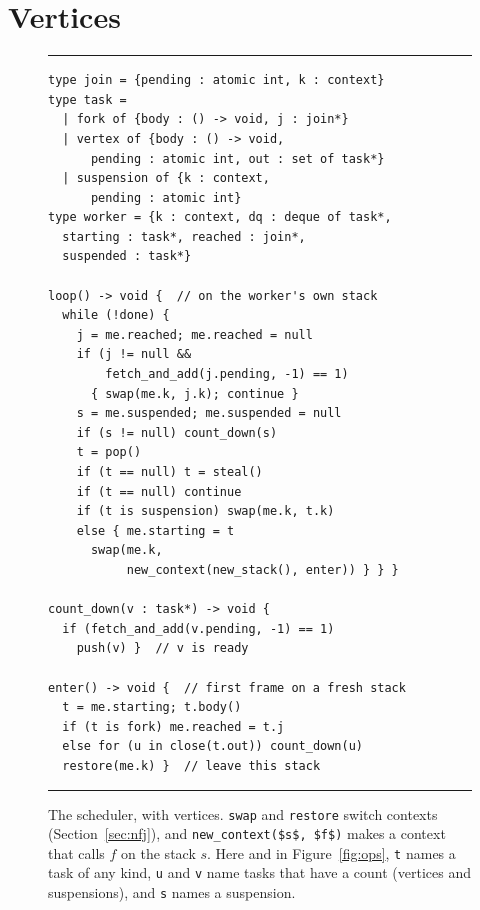 \documentclass[sigplan,nonacm]{acmart}
\begin{document}
\section{Vertices}
\label{sec:vertices}

\begin{figure}
\hrule
\begin{lstlisting}
type join = {pending : atomic int, k : context}
type task =
  | fork of {body : () -> void, j : join*}
  | vertex of {body : () -> void,
      pending : atomic int, out : set of task*}
  | suspension of {k : context,
      pending : atomic int}
type worker = {k : context, dq : deque of task*,
  starting : task*, reached : join*,
  suspended : task*}

loop() -> void {  // on the worker's own stack
  while (!done) {
    j = me.reached; me.reached = null
    if (j != null &&
        fetch_and_add(j.pending, -1) == 1)
      { swap(me.k, j.k); continue }
    s = me.suspended; me.suspended = null
    if (s != null) count_down(s)
    t = pop()
    if (t == null) t = steal()
    if (t == null) continue
    if (t is suspension) swap(me.k, t.k)
    else { me.starting = t
      swap(me.k,
           new_context(new_stack(), enter)) } } }

count_down(v : task*) -> void {
  if (fetch_and_add(v.pending, -1) == 1)
    push(v) }  // v is ready

enter() -> void {  // first frame on a fresh stack
  t = me.starting; t.body()
  if (t is fork) me.reached = t.j
  else for (u in close(t.out)) count_down(u)
  restore(me.k) }  // leave this stack
\end{lstlisting}
\hrule
\caption{The scheduler, with vertices.
  \lstinline|swap| and \lstinline|restore| switch contexts
  (Section~\ref{sec:nfj}), and \lstinline|new_context($s$, $f$)| makes
  a context that calls $f$ on the stack $s$.  Here and in
  Figure~\ref{fig:ops}, \lstinline|t| names a task of any kind,
  \lstinline|u| and \lstinline|v| name tasks that have a count
  (vertices and suspensions), and \lstinline|s| names a suspension.}
\label{fig:scheduler}
\end{figure}
\end{document}
